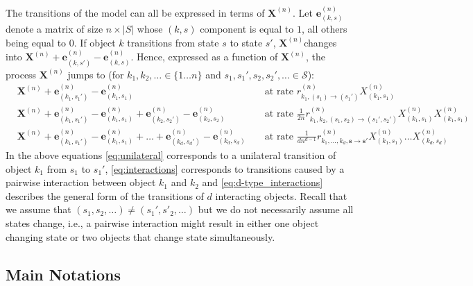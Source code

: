 \documentclass[acmsmall]{acmart}
\newcommand\bs{\mathbf{s}}
\newcommand\be{\mathbf{e}}
\newcommand\bX{\mathbf{X}}
\newcommand\calS{\mathcal{S}}
\newcommand\toN{^{(n)}}
\newcommand\bXn{\bX\toN}
\begin{document}
The transitions of the model can all be expressed in terms of $\bX\toN$. Let $\be\toN_{(k,s)}$ denote a matrix of size $n\times |S|$ whose $(k,s)$ component is equal to $1$, all others being equal to $0$. If object $k$ transitions from state $s$ to state $s'$, $\bXn$changes into $\bXn+\be\toN_{(k,s')}-\be\toN_{(k,s)}$. Hence, expressed as a function of $\bXn$, the process $\bX^{(n)}$ jumps to (for $k_1,k_2, \hdots \in\{1\hdots n\}$ and $s_1,s_1',s_2,s_2',\hdots \in\calS$):
\color{myorange}
\begin{subequations}
  \begin{align}
    &\bX^{(n)} {+} \be\toN_{(k_1,s_1')}{-}\be\toN_{(k_1,s_1)} && \text{ at rate $r_{k_1,(s_1)\rightarrow (s_1')}\toN X_{(k_1,s_1)}^{(n)}$}\label{eq:unilateral}\\
    &\bX^{(n)} {+} \be\toN_{(k_1,s_1')}{-}\be\toN_{(k_1,s_1)} + \be\toN_{(k_2,s_2')}{-}\be\toN_{(k_2,s_2)} && \text{ at rate $\frac{1}{2n}r_{k_1,k_2,(s_1,s_2) \rightarrow (s_1',s_2')}\toN X_{(k_1,s_1)}^{(n)}X_{(k_1,s_1)}^{(n)}$}\label{eq:interactions} \\
    &\bX^{(n)} {+} \be\toN_{(k_1,s_1')}{-}\be\toN_{(k_1,s_1)}{+}\hdots{+}\be\toN_{(k_{d},s_{d}')}{-}\be\toN_{(k_{d},s_{d})} &&\text{ at rate $\frac{1}{d n^{d-1}}r_{k_1,\hdots,k_{d},\bs \rightarrow \bs'}\toN X_{(k_1,s_1)}^{(n)}\hdots X_{(k_{d},s_{d})}^{(n)}$} \label{eq:d-type_interactions}
\end{align}
\label{eq:transitions}
\end{subequations}
In the above equations \eqref{eq:unilateral} corresponds to a unilateral transition of object $k_1$ from $s_1$ to $s_1'$, \eqref{eq:interactions} corresponds to transitions caused by a pairwise interaction between object $k_1$ and $k_2$ and \eqref{eq:d-type_interactions} describes the general form of the transitions of $d$ interacting objects. Recall that we assume that $(s_1,s_2,\hdots)\ne(s_1',s'_2,\hdots)$ but we do not necessarily assume all states change, i.e., a pairwise interaction might result in either one object changing state or two objects that change state simultaneously.
\color{black}



\subsection{Main Notations}
\end{document}
